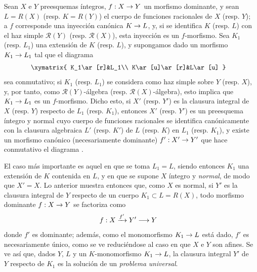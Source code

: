 \documentclass[oneside,10pt]{amsart}
\makeatletter
\newcommand{\ega@arrow}[2]{\mathchoice{#1}{#2}{#2}{#2}}
\renewcommand{\to}{\ega@arrow{\longrightarrow}{\rightarrow}}
\newcommand{\oldpage}[2][]{\marginnote{\normalfont\footnotesize\textbf{#1}~|~#2}\ignorespaces}
\let\EGAOriginalLabel\label
\renewcommand{\label}[1]{\phantomsection\EGAOriginalLabel{#1}}
\makeatother
\begin{document}
\begin{env}[6.3.9]
\label{II.6.3.9-fr}
Sean $X$ e $Y$ preesquemas íntegros, $f:X\to Y$ un morfismo dominante, y sean $L=R(X)$ (resp. $K=R(Y)$) el cuerpo de funciones racionales de $X$ (resp. $Y$);
a $f$ corresponde una inyección canónica $K\to L$, y, si se identifica $K$ (resp. $L$) con el haz simple $\mathcal{R}(Y)$ (resp. $\mathcal{R}(X)$), esta inyección es un $f$-morfismo.
Sea $K_1$ (resp. $L_1$) una extensión de $K$ (resp. $L$), y supongamos dado un morfismo $K_1\to L_1$ tal que el diagrama
\[
\xymatrix{
K_1\ar[r]&L_1\\
K\ar[u]\ar[r]&L\ar[u]
}
\]
sea conmutativo;
si $K_1$ (resp. $L_1$) se considera como haz simple sobre $Y$ (resp. $X$), y, por tanto, como $\mathcal{R}(Y)$-álgebra (resp. $\mathcal{R}(X)$-álgebra), esto implica que $K_1\to L_1$ es un $f$-morfismo.
Dicho esto, si $X'$ (resp. $Y'$) es la clausura integral de $X$ (resp. $Y$) respecto de $L_1$ (resp. $K_1$), entonces $X'$ (resp. $Y'$) es un preesquema íntegro y normal  cuyo cuerpo de funciones racionales se identifica canónicamente con la clausura algebraica
\oldpage[II]{120}
 $L'$ (resp. $K'$) de $L$ (resp. $K$) en $L_1$ (resp. $K_1$), y existe un morfismo canónico (necesariamente dominante) $f':X'\to Y'$ que hace conmutativo el diagrama .


El caso más importante es aquel en que se toma $L_1=L$, siendo entonces $K_1$ una extensión de $K$ contenida en $L$, y en que se supone $X$ íntegro y \emph{normal}, de modo que $X'=X$.
Lo anterior muestra entonces que, como $X$ es normal, si $Y'$ es la clausura integral de $Y$ respecto de un cuerpo $K_1\subset L=R(X)$, todo morfismo dominante $f:X\to Y$ se factoriza como
\[
f:X\xrightarrow{f'}Y'\to Y
\]
donde $f'$ es dominante;
además, como el monomorfismo $K_1\to L$ está dado, $f'$ es necesariamente único, como se ve reduciéndose al caso en que $X$ e $Y$ son afines.
Se ve así que, dados $Y$, $L$ y un $K$-monomorfismo $K_1\to L$, la clausura integral $Y'$ de $Y$ respecto de $K_1$ es la solución de un \emph{problema universal}.
\end{env}
\end{document}
